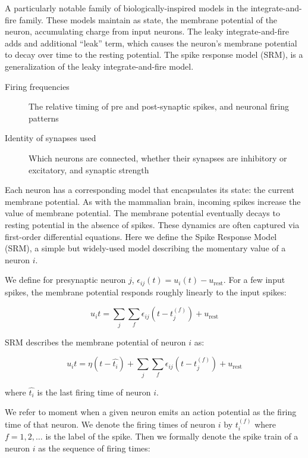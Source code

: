 \documentclass[fyp]{socreport}
\begin{document}
A particularly notable family of biologically-inspired models in the
integrate-and-fire family. These models maintain as state, the membrane
potential of the neuron, accumulating charge from input neurons. The leaky
integrate-and-fire adds and additional ``leak'' term, which causes the neuron's
membrane potential to decay over time to the resting potential. The spike
response model (SRM), is a generalization of the leaky integrate-and-fire model.

\begin{description}
\item[{Firing frequencies}] The relative timing of pre and post-synaptic spikes,
and neuronal firing patterns
\item[{Identity of synapses used}] Which neurons are connected, whether their
synapses are inhibitory or excitatory, and synaptic strength
\end{description}

Each neuron has a corresponding model that encapsulates its state: the current
membrane potential. As with the mammalian brain, incoming spikes increase the
value of membrane potential. The membrane potential eventually decays to resting
potential in the absence of spikes. These dynamics are often captured via
first-order differential equations. Here we define the Spike Response Model
(SRM), a simple but widely-used model describing the momentary value of a neuron
\(i\).

We define for presynaptic neuron \(j\),
\(\epsilon_{ij}(t) = u_{i}(t) - u_{\text{rest}}\). For a few input spikes, the
membrane potential responds roughly linearly to the input spikes:

\begin{equation} u_i{t} = \sum_{j}\sum_{f} \epsilon_{ij}(t - t_j^{(f)}) + u_{\text{rest}}
\end{equation}

SRM describes the membrane potential of neuron \(i\) as:

\begin{equation} u_i{t} = \eta (t - \hat{t_i}) + \sum_{j}\sum_{f} \epsilon_{ij}(t - t_j^{(f)}) + u_{\text{rest}}
\end{equation}

where \(\hat{t_i}\) is the last firing time of neuron \(i\).

We refer to moment when a given neuron emits an action potential as the firing
time of that neuron. We denote the firing times of neuron \(i\) by \(t_i^{(f)}\)
where \(f = 1,2,\dots\) is the label of the spike.  Then we formally denote the
spike train of a neuron \(i\) as the sequence of firing times:
\end{document}
